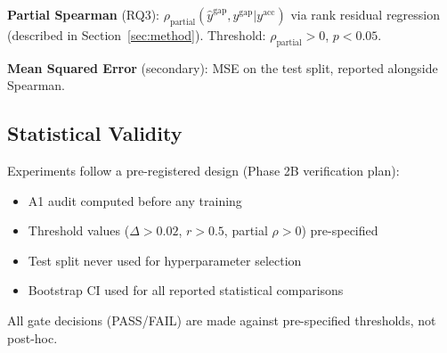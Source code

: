 \textbf{Partial Spearman} (RQ3): $\rho_{\text{partial}}(\hat{y}^{\text{gap}}, y^{\text{gap}} | y^{\text{acc}})$ via rank residual regression (described in Section~\ref{sec:method}). Threshold: $\rho_{\text{partial}} > 0$, $p < 0.05$.

\textbf{Mean Squared Error} (secondary): MSE on the test split, reported alongside Spearman.

\subsection{Statistical Validity}

Experiments follow a pre-registered design (Phase 2B verification plan):
\begin{itemize}
\item A1 audit computed before any training
\item Threshold values ($\Delta > 0.02$, $r > 0.5$, partial $\rho > 0$) pre-specified
\item Test split never used for hyperparameter selection
\item Bootstrap CI used for all reported statistical comparisons
\end{itemize}

All gate decisions (PASS/FAIL) are made against pre-specified thresholds, not post-hoc.

